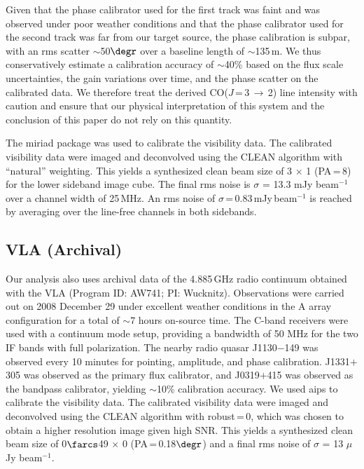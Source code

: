 \documentclass[]{emulateapj}
\newcommand{\rarr}{$\rightarrow$}
\newcommand{\cco}{\mbox{CO($J$\,=\,3\,\rarr\,2)}\xspace}
\newcommand{\pmOne}{\mbox{$^{-1}$}\xspace}
\newcommand{\ncode}[1]{{\sc #1}}
\begin{document}
Given that the phase calibrator used for the first track was faint and was
observed under poor weather conditions and that the phase calibrator used for
the second track was far from our target source, the phase calibration is
subpar, with an rms scatter $\sim$50$\degr$ over a baseline length of $\sim$135\,m.
We thus conservatively estimate
a calibration accuracy of $\sim$40\% based on the flux scale uncertainties,    %
the gain variations over time, and the phase scatter on the calibrated data. We
therefore treat the derived \cco line intensity with caution and ensure that our physical interpretation
of this system and the conclusion of this paper do not rely on this quantity.

The \ncode{miriad} package was used to calibrate the visibility data.
The calibrated visibility data were
imaged and deconvolved using the CLEAN algorithm with ``natural'' weighting. This yields a synthesized clean
beam size of 3 $\times$ 1 (PA\,=\,8\degr) for the lower sideband
image cube. The final rms noise is $\sigma$ = 13.3 mJy beam$^{-1}$
over a channel width of 25\,MHz. An rms noise of
$\sigma$\,=\,0.83\,mJy\,beam\pmOne is reached by averaging over the
line-free channels in both sidebands.

\subsection{VLA (Archival)}
Our analysis also uses archival data of the 4.885\,GHz
radio continuum obtained with the
VLA (Program ID: AW741; PI: Wucknitz).
Observations were carried out on 2008 December 29 under excellent weather
conditions in the A array configuration for a total of $\sim$7 hours on-source time. The C-band receivers were used with a continuum mode setup,
providing a bandwidth of 50 MHz for the two IF bands with full polarization.
The nearby radio quasar J1130$-$149 was observed every 10 minutes for
pointing, amplitude, and phase calibration. J1331$+$305 was observed as the
primary flux calibrator, and J0319$+$415 was observed as the bandpass
calibrator, yielding $\sim$10\% calibration accuracy.
We used \ncode{aips} to calibrate the visibility data.
The calibrated visibility data were imaged and deconvolved using
the CLEAN algorithm with robust\,=\,0, which
was chosen to obtain a higher resolution image given high SNR.
This yields a synthesized clean
beam size of 0$\farcs$49 $\times$ 0 (PA\,=\,0.18$\degr$) and a final
rms noise of $\sigma$ = 13 $\mu$Jy beam\pmOne.
\end{document}

